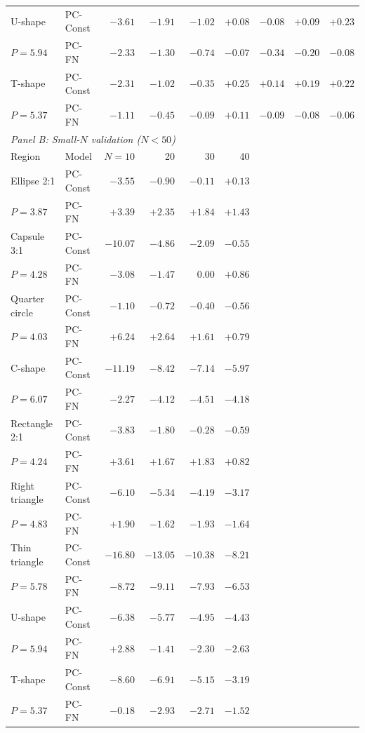 \begin{table}[htbp]
\begin{tabular}{llrrrrrrr}
\addlinespace[2pt]
U-shape & PC-Const & $-3.61$ & $-1.91$ & $-1.02$ & $+0.08$ & $-0.08$ & $+0.09$ & $+0.23$ \\
$P = 5.94$ & PC-FN & $-2.33$ & $-1.30$ & $-0.74$ & $-0.07$ & $-0.34$ & $-0.20$ & $-0.08$ \\
\addlinespace[2pt]
T-shape & PC-Const & $-2.31$ & $-1.02$ & $-0.35$ & $+0.25$ & $+0.14$ & $+0.19$ & $+0.22$ \\
$P = 5.37$ & PC-FN & $-1.11$ & $-0.45$ & $-0.09$ & $+0.11$ & $-0.09$ & $-0.08$ & $-0.06$ \\
\midrule
\multicolumn{9}{l}{\textit{Panel B: Small-$N$ validation ($N < 50$)}} \\
\midrule
Region & Model & $N = 10$ & 20 & 30 & 40 &  &  &  \\
\midrule
Ellipse 2:1 & PC-Const & $-3.55$ & $-0.90$ & $-0.11$ & $+0.13$ &  &  &  \\
$P = 3.87$ & PC-FN & $+3.39$ & $+2.35$ & $+1.84$ & $+1.43$ &  &  &  \\
\addlinespace[2pt]
Capsule 3:1 & PC-Const & $-10.07$ & $-4.86$ & $-2.09$ & $-0.55$ &  &  &  \\
$P = 4.28$ & PC-FN & $-3.08$ & $-1.47$ & $0.00$ & $+0.86$ &  &  &  \\
\addlinespace[2pt]
Quarter circle & PC-Const & $-1.10$ & $-0.72$ & $-0.40$ & $-0.56$ &  &  &  \\
$P = 4.03$ & PC-FN & $+6.24$ & $+2.64$ & $+1.61$ & $+0.79$ &  &  &  \\
\addlinespace[2pt]
C-shape & PC-Const & $-11.19$ & $-8.42$ & $-7.14$ & $-5.97$ &  &  &  \\
$P = 6.07$ & PC-FN & $-2.27$ & $-4.12$ & $-4.51$ & $-4.18$ &  &  &  \\
\addlinespace[2pt]
Rectangle 2:1 & PC-Const & $-3.83$ & $-1.80$ & $-0.28$ & $-0.59$ &  &  &  \\
$P = 4.24$ & PC-FN & $+3.61$ & $+1.67$ & $+1.83$ & $+0.82$ &  &  &  \\
\addlinespace[2pt]
Right triangle & PC-Const & $-6.10$ & $-5.34$ & $-4.19$ & $-3.17$ &  &  &  \\
$P = 4.83$ & PC-FN & $+1.90$ & $-1.62$ & $-1.93$ & $-1.64$ &  &  &  \\
\addlinespace[2pt]
Thin triangle & PC-Const & $-16.80$ & $-13.05$ & $-10.38$ & $-8.21$ &  &  &  \\
$P = 5.78$ & PC-FN & $-8.72$ & $-9.11$ & $-7.93$ & $-6.53$ &  &  &  \\
\addlinespace[2pt]
U-shape & PC-Const & $-6.38$ & $-5.77$ & $-4.95$ & $-4.43$ &  &  &  \\
$P = 5.94$ & PC-FN & $+2.88$ & $-1.41$ & $-2.30$ & $-2.63$ &  &  &  \\
\addlinespace[2pt]
T-shape & PC-Const & $-8.60$ & $-6.91$ & $-5.15$ & $-3.19$ &  &  &  \\
$P = 5.37$ & PC-FN & $-0.18$ & $-2.93$ & $-2.71$ & $-1.52$ &  &  &  \\
\bottomrule
\end{tabular}
\end{table}

